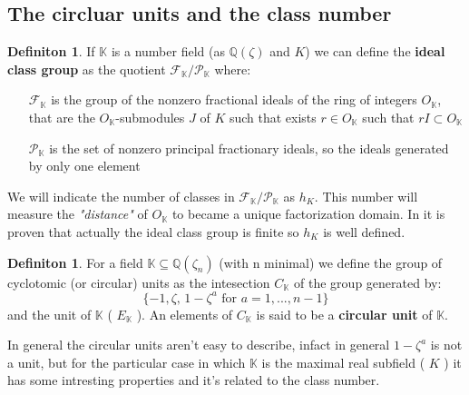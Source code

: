 \documentclass[]{article}
\theoremstyle{plain}
\theoremstyle{remark}
\theoremstyle{definition}
\newtheorem{deff}[teo]{Definiton}
\newcommand{\K}{\mathbb{K}}
\newcommand{\Q} {\mathbb{Q}}
\begin{document}
	\subsection{The circluar units and the class number}

	\begin{deff}
		If $ \K $ is a number field (as $ \Q (\zeta) $ and $ K $)  we can define the \textbf{ideal class group} as the quotient $ \mathcal{F}_\K / \mathcal{P}_\K $ where:
	\begin{itemize}
		\item[$ \mathcal{F}_\K $] is the group of the nonzero fractional ideals of the ring of integers  $ O_\K $, that are the $ O_\K  $-submodules $ J $ of $ K $ such that exists $ r \in O_\K  $ such that $ r I \subset O_\K  $
		\item[$ \mathcal{P}_\K $] is the set of nonzero principal fractionary ideals, so the ideals generated by only one element
	\end{itemize}
	\end{deff}


	We will indicate the number of classes in $ \mathcal{F}_\K / \mathcal{P}_\K $ as $ h_K $. This number will measure the \textit{"distance"} of $ O_\K $ to became a unique factorization domain. In \cite[Page~141]{RIN} it is proven that actually the ideal class group is finite so $ h_K $ is well defined. 

	
	\begin{deff}
		For a field $ \K \subseteq \Q (\zeta_n) $ (with n minimal) we define the group of cyclotomic (or circular) units as the intesection $ C_\K $ of the group generated by:
		\begin{equation*}
			\{ -1 ,  \zeta , \, 1 - \zeta ^a \text{ for } a = 1, ... , n-1 \}
		\end{equation*}
		and the unit of $ \K $ ( $ E_{\K} $ ). An elements of $ C_\K $ is said to be a \textbf{circular unit} of $ \K $. 
	\end{deff}

	In general the circular units aren't easy to describe, infact in general $ 1 - \zeta ^a $ is not a unit, but for the particular case in which $ \K $ is the maximal real subfield ( $ K $ ) it has some intresting properties and it's related to the class number.
	
\end{document}
